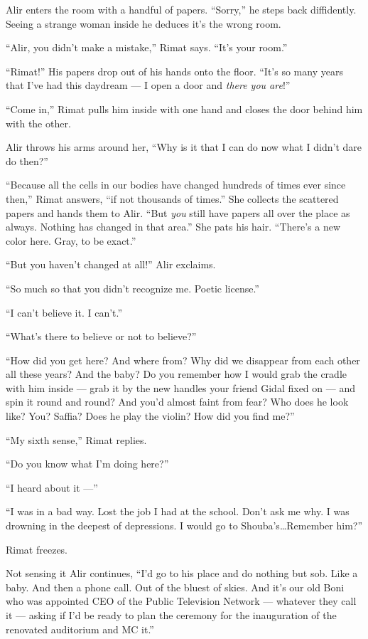 \documentclass[twoside,11pt,openany]{book}
\begin{document}
Alir enters the room with a handful of papers. ``Sorry,'' he steps back diffidently. Seeing a
strange woman inside he deduces it's the wrong room.

``Alir, you didn't make a mistake,'' Rimat says. ``It's your room.''


``Rimat!'' His papers drop out of his hands onto the floor.  ``It's so many years
that I've had this daydream --- I open a door and \textit{there you are}!''

``Come in,'' Rimat pulls him inside with one hand and closes the door behind him with the
other.

Alir throws his arms around her, ``Why is it that I can do now what I didn't dare do then?''

``Because all the cells in our bodies have changed hundreds of times ever since then,'' Rimat
answers, ``if not thousands of times.'' She collects the scattered papers and hands them to
Alir. ``But \textit{you} still have papers all over the place as always. Nothing has changed in that
area.'' She pats his hair. ``There's a new color here. Gray, to be exact.''

``But you haven't changed at all!'' Alir exclaims.

``So much so that you didn't recognize me. Poetic license.''

``I can't believe it. I can't.''

``What's there to believe or not to believe?''

``How did you get here? And where from? Why did we disappear from each other all these years? And the baby?
Do you remember how I would grab the cradle with him inside --- grab it by the new handles your friend Gidal
fixed on ---
and spin it round and round? And you'd almost faint from fear? Who does he look like? You? Saffia? Does he play the
violin? How did you find me?''

``My sixth sense,'' Rimat replies.

``Do you know what I'm doing here?''

``I heard about it ---''

``I was in a bad way. Lost the job I had at the school. Don't ask me why. I was drowning in the deepest of
depressions. I would go to Shouba's{\ldots}Remember him?''

Rimat freezes.

Not sensing it Alir continues, ``I'd go to his place and do nothing but sob. Like a baby. And then a phone
call. Out of the bluest of skies. And it's our old Boni who was appointed CEO of the Public Television Network ---
whatever they call it --- asking if I'd be ready to plan the ceremony for the inauguration of the renovated auditorium
and MC it.''
\end{document}
